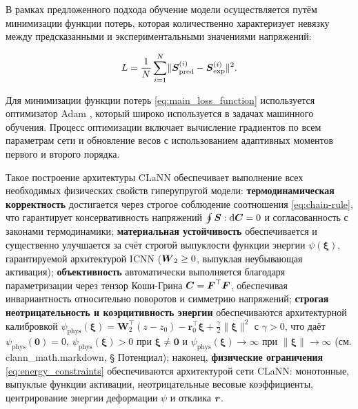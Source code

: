 

В рамках предложенного подхода обучение модели осуществляется путём минимизации функции потерь, 
которая количественно характеризует невязку между предсказанными и экспериментальными значениями напряжений:

\begin{equation}
 L = \frac{1}{N}\sum_{i=1}^N \lVert \boldsymbol{S}^{(i)}_{\text{pred}} - \boldsymbol{S}^{(i)}_{\text{exp}} \rVert^2.
\label{eq:main_loss_function}
\end{equation}

Для минимизации функции потерь \eqref{eq:main_loss_function} используется оптимизатор Adam \cite{kingma2014adam}, 
который широко используется в задачах машинного обучения. 
Процесс оптимизации включает вычисление градиентов по всем параметрам сети и обновление весов 
с использованием адаптивных моментов первого и второго порядка.

Такое построение архитектуры CLaNN обеспечивает выполнение всех необходимых физических свойств гиперупругой модели: 
\textbf{термодинамическая корректность} достигается через строгое соблюдение соотношения \eqref{eq:chain-rule}, 
что гарантирует консервативность напряжений $\oint \boldsymbol{S}:\mathrm{d}\boldsymbol{C} = 0$ и согласованность с законами 
термодинамики; 
\textbf{материальная устойчивость} обеспечивается и существенно улучшается за счёт строгой выпуклости функции энергии 
$\psi(\boldsymbol{\xi})$, гарантируемой архитектурой ICNN ($\boldsymbol{W}_2 \ge 0$, выпуклая неубывающая активация); 
\textbf{объективность} автоматически выполняется благодаря параметризации через тензор 
Коши-Грина $\boldsymbol{C} = \boldsymbol{F}^{\top}\boldsymbol{F}$, обеспечивая инвариантность относительно поворотов и симметрию напряжений; 
\textbf{строгая неотрицательность и коэрцитивность энергии} обеспечиваются архитектурной калибровкой 
$\psi_{\mathrm{phys}}(\boldsymbol{\xi}) = \mathbf{W}_2^{\top}(z - z_0) - \mathbf{r}_0^{\top}\boldsymbol{\xi} + \tfrac{\gamma}{2}\|\boldsymbol{\xi}\|^2$ 
с $\gamma>0$, что даёт $\psi_{\mathrm{phys}}(\mathbf{0})=0$, $\psi_{\mathrm{phys}}(\boldsymbol{\xi})>0$ при $\boldsymbol{\xi}\ne\mathbf{0}$ и 
$\psi_{\mathrm{phys}}(\boldsymbol{\xi})\to\infty$ при $\|\boldsymbol{\xi}\|\to\infty$ (см. clann\_math.markdown, § Потенциал); 
наконец, \textbf{физические ограничения} \eqref{eq:energy_constraints} обеспечиваются архитектурой сети CLaNN: монотонные, выпуклые функции активации,
неотрицательные весовые коэффициенты, центрирование энергии деформации $\psi$ и отклика $\boldsymbol{r}$.



